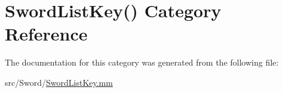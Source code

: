 \hypertarget{category_sword_list_key_07_08}{\section{Sword\-List\-Key() Category Reference}
\label{category_sword_list_key_07_08}
}


The documentation for this category was generated from the following file\-:\begin{DoxyCompactItemize}
\item 
src/\-Sword/\hyperlink{_sword_list_key_8mm}{Sword\-List\-Key.\-mm}\end{DoxyCompactItemize}
